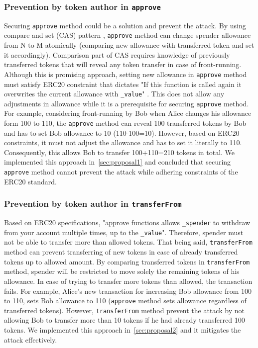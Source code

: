 \subsubsection*{Prevention by token author in \texttt{approve}} Securing \texttt{approve} method could be a solution and prevent the attack. By using compare and set (CAS) pattern \cite{Ref06}, \texttt{approve} method can change spender allowance from N to M atomically (\ie comparing new allowance with transferred token and set it accordingly). Comparison part of CAS requires knowledge of previously transferred tokens that will reveal any token transfer in case of front-running. Although this is promising approach,  setting new allowance in \texttt{approve} method must satisfy ERC20 constraint that dictates "If this function is called again it overwrites the current allowance with \texttt{\_value}" \cite{Ref08}. This does not allow any adjustments in allowance while it is a prerequisite for securing \texttt{approve} method. 
For example, considering front-running by Bob when Alice changes his allowance form 100 to 110, the \texttt{approve} method can reveal 100 transferred tokens by Bob and has to set Bob allowance to 10 (110-100=10). However, based on ERC20 constraints, it must not adjust the allowance and has to set it literally to 110. Consequently, this allows Bob to transfer 100+110=210 tokens in total. We implemented this approach in~\ref{sec:proposal1} and concluded that securing \texttt{approve} method cannot prevent the attack while adhering constraints of the ERC20 standard.
	
\subsubsection*{Prevention by token author in \texttt{transferFrom}} Based on ERC20 specifications, "approve functions allows \texttt{\_spender} to withdraw from your account multiple times, up to the \texttt{\_value}". Therefore, spender must not be able to transfer more than allowed tokens. That being said, \texttt{transferFrom} method can prevent transferring of new tokens in case of already transferred tokens up to allowed amount. By comparing transferred tokens in \texttt{transferFrom} method, spender will be restricted to move solely the remaining tokens of his allowance. In case of trying to transfer more tokens than allowed, the transaction fails. For example, Alice's new transaction for increasing Bob allowance from 100 to 110, sets Bob allowance to 110 (\texttt{approve} method sets allowance regardless of transferred tokens). However, \texttt{transferFrom} method prevent the attack by not allowing Bob to transfer more than 10 tokens if he had already transferred 100 tokens. We implemented this approach in~\ref{sec:proposal2} and it mitigates the attack effectively.

